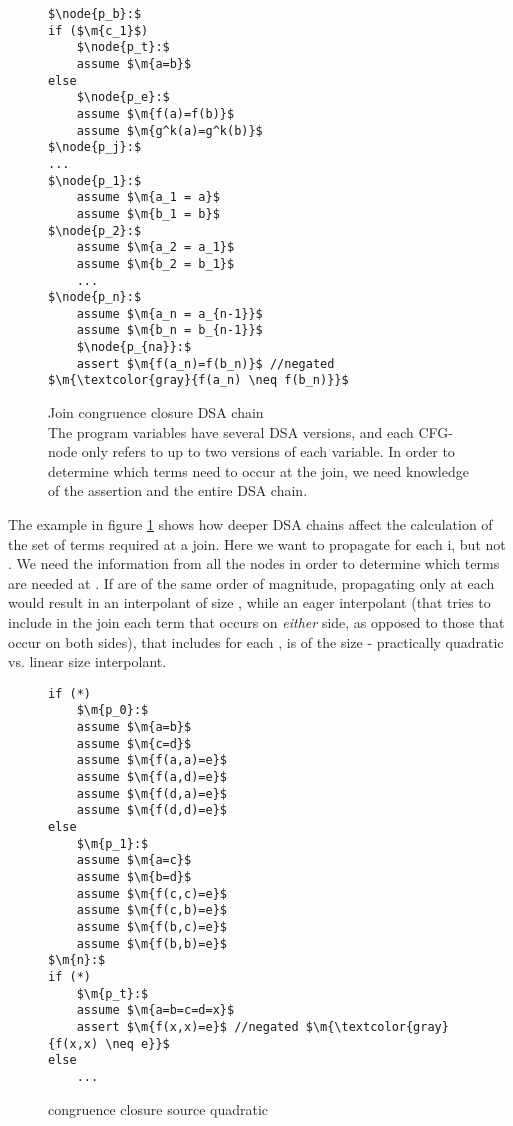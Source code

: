 \begin{figure}
\begin{lstlisting}
$\node{p_b}:$
if ($\m{c_1}$)
	$\node{p_t}:$
	assume $\m{a=b}$
else
	$\node{p_e}:$
	assume $\m{f(a)=f(b)}$
	assume $\m{g^k(a)=g^k(b)}$
$\node{p_j}:$
...
$\node{p_1}:$
	assume $\m{a_1 = a}$
	assume $\m{b_1 = b}$
$\node{p_2}:$
	assume $\m{a_2 = a_1}$
	assume $\m{b_2 = b_1}$
	...
$\node{p_n}:$
	assume $\m{a_n = a_{n-1}}$
	assume $\m{b_n = b_{n-1}}$
	$\node{p_{na}}:$
	assert $\m{f(a_n)=f(b_n)}$ //negated $\m{\textcolor{gray}{f(a_n) \neq f(b_n)}}$
\end{lstlisting}
\caption{Join congruence closure DSA chain\\
The program variables  have several DSA versions,
and each CFG-node only refers to up to two versions of each variable.
In order to determine which terms need to occur at the join, we need knowledge of the assertion and the entire DSA chain.}
\label{snippet3.23}
\end{figure}

The example in figure \ref{snippet3.23} shows how deeper DSA chains affect the calculation of the set of terms required at a join.
Here we want to propagate  for each i, but not .
We need the information from all the nodes  in order to determine which terms are needed at .
If  are of the same order of magnitude, propagating only  at each  would result in an interpolant of size , while an eager interpolant (that tries to include in the join each term that occurs on \emph{either} side, as opposed to those that occur on both sides), that includes  for each , is of the size  - practically quadratic vs. linear size interpolant.

\begin{figure}
\begin{lstlisting}
if (*)
	$\m{p_0}:$
	assume $\m{a=b}$
	assume $\m{c=d}$
	assume $\m{f(a,a)=e}$
	assume $\m{f(a,d)=e}$
	assume $\m{f(d,a)=e}$
	assume $\m{f(d,d)=e}$
else
	$\m{p_1}:$
	assume $\m{a=c}$
	assume $\m{b=d}$
	assume $\m{f(c,c)=e}$
	assume $\m{f(c,b)=e}$
	assume $\m{f(b,c)=e}$
	assume $\m{f(b,b)=e}$
$\m{n}:$
if (*)
	$\m{p_t}:$
	assume $\m{a=b=c=d=x}$
	assert $\m{f(x,x)=e}$ //negated $\m{\textcolor{gray}{f(x,x) \neq e}}$
else
	...
\end{lstlisting}
\caption{congruence closure source quadratic}
\label{snippet3.10}
\end{figure}


